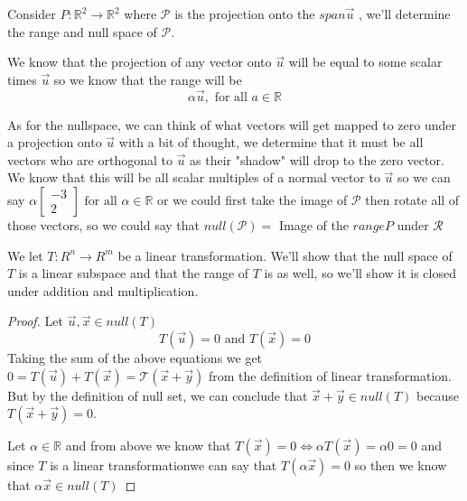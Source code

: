 \documentclass[notoc,notitlepage]{tufte-book}
\newcommand\mat[1]{\begin{bmatrix}#1\end{bmatrix}}
\begin{document}
\begin{ex}
    Consider $P : \mathbb{R}^2 \to  \mathbb{R}^2$ where $\mathcal{P}$ is the
    projection onto the $\mathit{span} {\vec{u}} $ \sidenote{Remember $\vec{u} =
    \mat{ 2 \\ 3 }$ }, we'll determine the range and null space of $\mathcal{P}$.
    
    We know that the projection of any vector onto $\vec{u}$ will be equal to
    some scalar times $\vec{u}$ so we know that the range will be 
    \begin{equation*}
        \alpha \vec{u}, \text{ for all } a \in \mathbb{R}
    \end{equation*}

    As for the nullspace, we can think of what vectors will get mapped to zero
    under a projection onto $\vec{u}$ with a bit of thought, we determine that
    it must be all vectors who are orthogonal to $\vec{u}$ as their "shadow"
    will drop to the zero vector. We know that this will be all scalar
    multiples of a normal vector to $\vec{u}$ so we can say $\alpha \mat{ -3 \\
    2} \text{ for all } \alpha  \in \mathbb{R}$ or we could first take the image
    of $\mathcal{P}$ then rotate all of those vectors, so we could say that
    $\mathit{null} {\left( \mathcal{P} \right)} = $ Image of the $\mathit{range}
    {P} $ under $\mathcal{R}$ 
\end{ex}

\begin{eg}
    We let $T : R^{n} \to R^{m} $ be a linear transformation. We'll show that the
    null space of $T$ is a linear subspace and that the range of $T$ is as well, so
    we'll show it is closed under addition and multiplication.
\end{eg}

\begin{proof}
    Let $\vec{u}, \vec{x} \in \mathit{null} {\left( T \right)} $ 
    \begin{equation*}
        T\left(\vec{u}\right) = 0 \text{ and } T\left(\vec{x}\right) = 0
    \end{equation*}
    Taking the sum of the above equations we get $0 = T\left(\vec{u}\right) +
    T\left(\vec{x}\right) = \mathcal{T}\left(\vec{x} + \vec{y}\right)$ from the definition of linear transformation. But by the definition of null set, we can conclude that $\vec{x} + \vec{y} \in \mathit{null} {\left( T \right)} $ because $T\left(\vec{x} + \vec{y}\right) = 0$. 
    
    Let $\alpha \in \mathbb{R}$ and from above we know that $T\left(\vec{x}\right) = 0 \Leftrightarrow \alpha T\left(\vec{x}\right) = \alpha 0 = 0$ and since $T$ is a linear transformationwe can say that $T\left(\alpha \vec{x}\right) = 0$ so then we know that $\alpha \vec{x} \in \mathit{null} {\left( T \right)} $ 
\end{proof}
\end{document}
